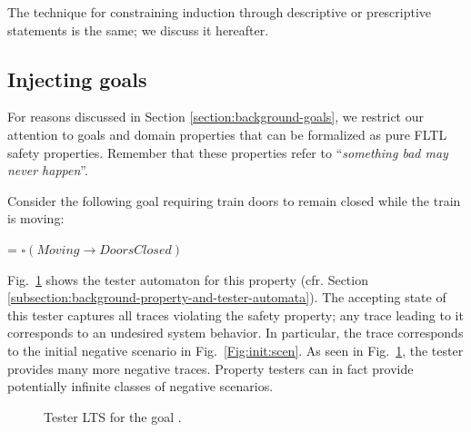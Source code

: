 The technique for constraining induction through descriptive or prescriptive statements is the same; we discuss it hereafter.


\subsection{Injecting goals\label{subsection:induction-pruning-with-goals}}

For reasons discussed in Section \ref{section:background-goals}, we restrict our attention to goals and domain properties that can be formalized as pure FLTL safety properties. Remember that these properties refer to  ``\emph{something bad may never happen}''.

Consider the following goal requiring train doors to remain closed while the train is moving:
\begin{center}
 = $\square(Moving \rightarrow DoorsClosed)$
\end{center}

Fig.~\ref{Fig.:tester-automaton-inductive} shows the tester automaton for this property (cfr. Section \ref{subsection:background-property-and-tester-automata}). The accepting state of this tester captures all traces violating the safety property; any trace leading to it corresponds to an undesired system behavior. In particular, the trace  corresponds to the initial negative scenario in Fig.~\ref{Fig:init:scen}. As seen in Fig.~\ref{Fig.:tester-automaton-inductive}, the tester provides many more negative traces. Property testers can in fact provide potentially infinite classes of negative scenarios.

\begin{figure}
\centering
{}
\caption[Tester LTS for the goal \emph{Maintain[DoorsClosed While Moving]}]{Tester LTS for the goal .\label{Fig.:tester-automaton-inductive}}
\end{figure}

